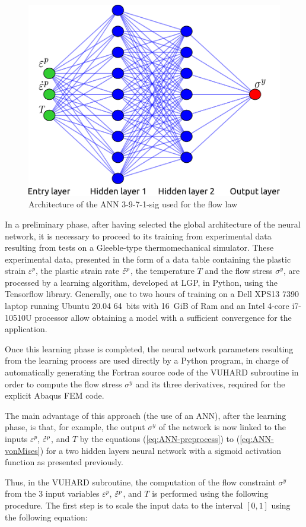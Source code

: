 \documentclass[preprint,12pt,times]{elsarticle}
\newcommand{\mdot}[1]{\accentset{\mbox{\bfseries .}}{#1}} %
\begin{document}
\begin{figure}[!h]
\centering
\includegraphics[width = 90 mm]{Figures/ANN}
\caption{Architecture of the ANN 3-9-7-1-sig used for the flow law}
\label{fig:ANN}
\end{figure}

In a preliminary phase, after having selected the global architecture of the neural network, it is necessary to proceed to its training from experimental data resulting from tests on a Gleeble-type thermomechanical simulator. These experimental data, presented in the form of a data table containing the plastic strain $\varepsilon^p$, the plastic strain rate $\mdot{\varepsilon}^p$, the temperature $T$ and the flow stress $\sigma^y$, are processed by a learning algorithm, developed at LGP, in Python, using the Tensorflow library. Generally, one to two hours of training on a Dell XPS13 7390 laptop running Ubuntu 20.04 64~bits with 16~GiB of Ram and an Intel 4-core i7-10510U processor allow obtaining a model with a sufficient convergence for the application.

Once this learning phase is completed, the neural network parameters resulting from the learning process are used directly by a Python program, in charge of automatically generating the Fortran source code of the VUHARD subroutine in order to compute the flow stress $\sigma^y$ and its three derivatives, required for the explicit Abaqus FEM code.

The main advantage of this approach (the use of an ANN), after the learning phase, is that, for example, the output $\sigma^y$ of the network is now linked to the inputs $\varepsilon^p$, $\mdot{\varepsilon}^p$, and $T$ by the equations (\ref{eq:ANN-preprocess}) to (\ref{eq:ANN-vonMises}) for a two hidden layers neural network with a sigmoid activation function as presented previously.

Thus, in the VUHARD subroutine, the computation of the flow constraint $\sigma^y$ from the 3 input variables $\varepsilon^p$, $\mdot{\varepsilon}^p$, and $T$ is performed using the following procedure. The first step is to scale the input data to the interval $[0,1]$ using the following equation:
\end{document}
